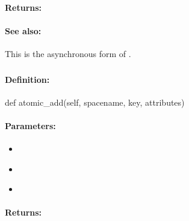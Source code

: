 \paragraph{Returns:}


\paragraph{See also:}  This is the asynchronous form of .

\pagebreak
\subsubsection{}
\label{api:python:atomic_add}


\paragraph{Definition:}
\begin{pythoncode}
def atomic_add(self, spacename, key, attributes)
\end{pythoncode}

\paragraph{Parameters:}
\begin{itemize}[noitemsep]
\item {}\\

\item {}\\

\item {}\\

\end{itemize}

\paragraph{Returns:}


\pagebreak
\subsubsection{}
\label{api:python:async_atomic_add}


